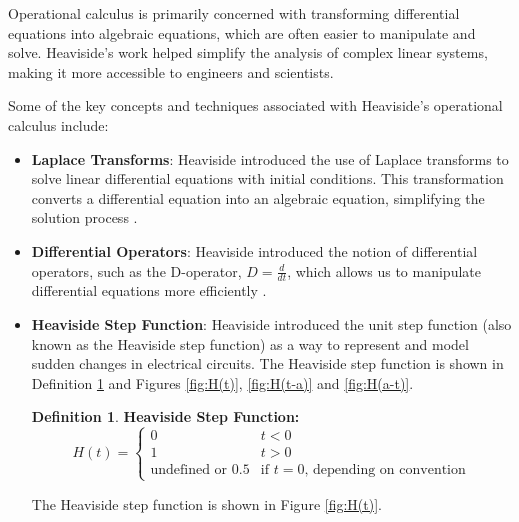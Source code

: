 \documentclass{article}
\theoremstyle{definition}
\newtheorem{definition}{Definition}[section]
\begin{document}
\begin{itemize}
\medskip
\noindent
Operational calculus is primarily concerned with transforming
differential equations into algebraic equations, which are often
easier to manipulate and solve. Heaviside's work helped simplify
the analysis of complex linear systems, making it more accessible
to engineers and scientists.

\medskip
\noindent
Some of the key concepts and techniques associated with
Heaviside's operational calculus include:

\begin{itemize}
\item {\bf Laplace Transforms}: Heaviside introduced the use of
Laplace transforms to solve linear differential equations with
initial conditions. This transformation converts a differential
equation into an algebraic equation, simplifying the solution
process \cite{dmm:dirac_delta_and_laplace_transform}.

\medskip
\item {\bf Differential Operators}: Heaviside introduced the
notion of differential operators, such as the D-operator, 
$D= \frac{d}{dt}$, which allows us to manipulate differential 
equations more efficiently 
\cite{d-operator,wikipedia:differential_operator}.

\medskip
\item {\bf Heaviside Step Function}: Heaviside introduced the
unit step function (also known as the Heaviside step function) 
as a way to represent and model sudden changes in electrical
circuits. The Heaviside step function is shown in Definition 
\ref{def:heaviside_function} and Figures \ref{fig:H(t)}, 
\ref{fig:H(t-a)} and \ref{fig:H(a-t)}.

\bigskip
\begin{definition} {\bf Heaviside Step Function:}
\bigskip
\begin{equation*}
H(t) =
 \begin{cases} 
   0 & t < 0  \\
   1 & t > 0 \\
   \text{undefined or 0.5} & \text{if $t = 0$, depending on convention}
   \end{cases}
\end{equation*}
\label{def:heaviside_function}
\end{definition}

\bigskip
\noindent
The Heaviside step function is shown in Figure \ref{fig:H(t)}.


\end{itemize}
\end{itemize}
\end{document}
